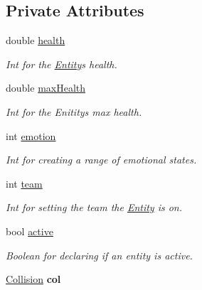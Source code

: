 \subsection*{Private Attributes}
\begin{DoxyCompactItemize}
\item 
double \hyperlink{classEntity_af5e13d4ed49e8f2954112784a73939ce}{health}\hypertarget{classEntity_af5e13d4ed49e8f2954112784a73939ce}{}\label{classEntity_af5e13d4ed49e8f2954112784a73939ce}

\begin{DoxyCompactList}\small\item\em Int for the \hyperlink{classEntity}{Entity}\textquotesingle{}s health. \end{DoxyCompactList}\item 
double \hyperlink{classEntity_a814aed95740c20b413e7acf387da9e9b}{max\+Health}\hypertarget{classEntity_a814aed95740c20b413e7acf387da9e9b}{}\label{classEntity_a814aed95740c20b413e7acf387da9e9b}

\begin{DoxyCompactList}\small\item\em Int for the Enitity\textquotesingle{}s max health. \end{DoxyCompactList}\item 
int \hyperlink{classEntity_a85a5efaff91b778e660972a9edcd1f27}{emotion}\hypertarget{classEntity_a85a5efaff91b778e660972a9edcd1f27}{}\label{classEntity_a85a5efaff91b778e660972a9edcd1f27}

\begin{DoxyCompactList}\small\item\em Int for creating a range of emotional states. \end{DoxyCompactList}\item 
int \hyperlink{classEntity_ad87a0ad851b569ef13889d903d502079}{team}\hypertarget{classEntity_ad87a0ad851b569ef13889d903d502079}{}\label{classEntity_ad87a0ad851b569ef13889d903d502079}

\begin{DoxyCompactList}\small\item\em Int for setting the team the \hyperlink{classEntity}{Entity} is on. \end{DoxyCompactList}\item 
bool \hyperlink{classEntity_a939da33e8b67b1d2ee227930aa72da3b}{active}\hypertarget{classEntity_a939da33e8b67b1d2ee227930aa72da3b}{}\label{classEntity_a939da33e8b67b1d2ee227930aa72da3b}

\begin{DoxyCompactList}\small\item\em Boolean for declaring if an entity is active. \end{DoxyCompactList}\item 
\hyperlink{classCollision}{Collision} {\bfseries col}\hypertarget{classEntity_ac09df9ac08d40a60519392f49bed4fa1}{}\label{classEntity_ac09df9ac08d40a60519392f49bed4fa1}


\end{DoxyCompactItemize}
